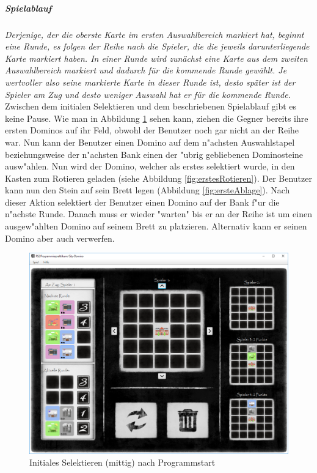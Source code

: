\subparagraph{Spielablauf}
\emph{Derjenige, der die oberste Karte im ersten Auswahlbereich markiert hat, beginnt eine Runde, es folgen der Reihe
nach die Spieler, die die jeweils darunterliegende Karte markiert haben. In einer Runde wird zunächst eine Karte
aus dem zweiten Auswahlbereich markiert und dadurch für die kommende Runde gewählt. Je wertvoller also seine
markierte Karte in dieser Runde ist, desto später ist der Spieler am Zug und desto weniger Auswahl hat er für die
kommende Runde.}
\cite{aufgabenstellung}
Zwischen dem initialen Selektieren und dem beschriebenen Spielablauf gibt es keine Pause. Wie man in Abbildung \ref{fig:initialesSelektierenMittig} sehen kann, ziehen die Gegner bereits ihre ersten Dominos auf ihr Feld, obwohl der Benutzer noch gar nicht an der Reihe war. Nun kann der Benutzer einen Domino auf dem n"achsten Auswahlstapel beziehungsweise der n"achsten Bank einen der "ubrig gebliebenen Dominosteine ausw"ahlen. Nun wird der Domino, welcher als erstes selektiert wurde, in den Kasten zum Rotieren geladen (siehe Abbildung \ref{fig:erstesRotieren}). Der Benutzer kann nun den Stein auf sein Brett legen (Abbildung \ref{fig:ersteAblage}). Nach dieser Aktion selektiert der Benutzer einen Domino auf der Bank f"ur die n"achste Runde. Danach muss er wieder "warten" bis er an der Reihe ist um einen ausgew"ahlten Domino auf seinem Brett zu platzieren. Alternativ kann er seinen Domino aber auch verwerfen.

\begin{figure}
	\centering
	\includegraphics{screenshots/screenshot_InitialesSelektieren2.png}
	\caption[Initiales Selektieren - mittig]{Initiales Selektieren (mittig) nach Programmstart}
	\label{fig:initialesSelektierenMittig}
\end{figure}


